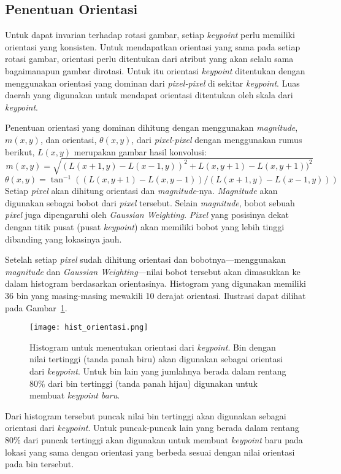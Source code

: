 \subsection{Penentuan Orientasi}
Untuk dapat invarian terhadap rotasi gambar, setiap \textit{keypoint} perlu memiliki orientasi yang konsisten. Untuk mendapatkan orientasi yang sama pada setiap rotasi gambar, orientasi perlu ditentukan dari atribut yang akan selalu sama bagaimanapun gambar dirotasi. Untuk itu orientasi \textit{keypoint} ditentukan dengan menggunakan orientasi yang dominan dari \textit{pixel-pixel} di sekitar \textit{keypoint}. Luas daerah yang digunakan untuk mendapat orientasi ditentukan oleh skala dari \textit{keypoint}. 

Penentuan orientasi yang dominan dihitung dengan menggunakan \textit{magnitude}, $m(x,y)$, dan orientasi, $\theta(x,y)$, dari \textit{pixel-pixel} dengan menggunakan rumus berikut, $L(x,y)$ merupakan gambar hasil konvolusi:
\[ 
m(x,y)=\sqrt{(L(x+1,y)-L(x-1,y))^{2}+L(x,y+1)-L(x,y+1))^{2}} 
\]
\[
\theta(x,y)=\tan^{-1}((L(x,y+1)-L(x,y-1))/(L(x+1,y)-L(x-1,y)))
\]
Setiap \textit{pixel} akan dihitung orientasi dan \textit{magnitude}-nya. \textit{Magnitude} akan digunakan sebagai bobot dari \textit{pixel} tersebut. Selain \textit{magnitude}, bobot sebuah \textit{pixel} juga dipengaruhi oleh \textit{Gaussian Weighting}. \textit{Pixel} yang posisinya dekat dengan titik pusat (pusat \textit{keypoint}) akan memiliki bobot yang lebih tinggi dibanding yang lokasinya jauh. 

Setelah setiap \textit{pixel} sudah dihitung orientasi dan bobotnya---menggunakan \textit{magnitude} dan \textit{Gaussian Weighting}---nilai bobot tersebut akan dimasukkan ke dalam histogram berdasarkan orientasinya. Histogram yang digunakan memiliki 36 bin yang masing-masing mewakili 10 derajat orientasi. Ilustrasi dapat dilihat pada Gambar~\ref{fig:hist_orientasi}.
\begin{figure}
	\centering
	\texttt{[image: hist\_orientasi.png]}
	\caption{Histogram untuk menentukan orientasi dari \textit{keypoint}. Bin dengan nilai tertinggi (tanda panah biru) akan digunakan sebagai orientasi dari \textit{keypoint}. Untuk bin lain yang jumlahnya berada dalam rentang $80\%$ dari bin tertinggi (tanda panah hijau) digunakan untuk membuat \textit{keypoint baru}.}
	\label{fig:hist_orientasi}
\end{figure}

Dari histogram tersebut puncak nilai bin tertinggi akan digunakan sebagai orientasi dari \textit{keypoint}. Untuk puncak-puncak lain yang berada dalam rentang $80\%$ dari puncak tertinggi akan digunakan untuk membuat \textit{keypoint} baru pada lokasi yang sama dengan orientasi yang berbeda sesuai dengan nilai orientasi pada bin tersebut.

